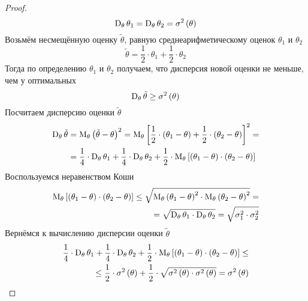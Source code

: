 \begin{proof}
  $$\operatorname{D}_{\theta} \theta_1
    = \operatorname{D}_{\theta} \theta_2
    = \sigma^2\left(\theta\right)$$
  Возьмём несмещённую оценку $\tilde{\theta}$,
  равную среднеарифметическому оценок $\theta_1$ и $\theta_2$
  $$\tilde{\theta}= \frac{1}{2}\cdot \theta_1+ \frac{1}{2}\cdot\theta_2$$
  Тогда по определению $\theta_1$ и $\theta_2$ получаем,
  что дисперсия новой оценки не меньше, чем у оптимальных
  \begin{equation}\label{eq:estimator_ge}
    \operatorname{D}_{\theta} \tilde{\theta}\ge\sigma^2\left(\theta\right)
  \end{equation}
  Посчитаем дисперсию оценки $\tilde{\theta}$
  \begin{align*}
  \operatorname{D}_{\theta} \tilde{\theta}
    &= \operatorname{M}_{\theta} \left( \tilde{\theta}-\theta \right)^2
    = \operatorname{M}_{\theta} \left[ \frac{1}{2}\cdot \left( \theta_1-\theta \right)
      + \frac{1}{2}\cdot \left( \theta_2-\theta \right) \right]^2= \\
    &= \frac{1}{4}\cdot \operatorname{D}_{\theta} \theta_1
      + \frac{1}{4}\cdot \operatorname{D}_{\theta} \theta_2
      + \frac{1}{2}\cdot \operatorname{M}_{\theta} \left[ \left( \theta_1-\theta \right)
          \cdot \left( \theta_2-\theta \right) \right]
  \end{align*}
  Воспользуемся неравенством Коши%
  \begin{eqnarray}\label{eq:koshi_eq}
    \operatorname{M}_{\theta} \left[ \left( \theta_1-\theta \right)
      \cdot \left( \theta_2-\theta \right) \right]
    \le\sqrt{\operatorname{M}_{\theta} \left( \theta_1-\theta \right)^2
      \cdot \operatorname{M}_{\theta} \left( \theta_2-\theta \right)^2}= \\
    = \sqrt{\operatorname{D}_{\theta} \theta_1
      \cdot \operatorname{D}_{\theta} \theta_2}
    = \sqrt{\sigma_1^2 \cdot \sigma_2^2}\nonumber
  \end{eqnarray}
  Вернёмся к вычислению дисперсии оценки $\tilde{\theta}$
  \begin{align*}
    \frac{1}{4}\cdot \operatorname{D}_{\theta} \theta_1
      + \frac{1}{4}\cdot \operatorname{D}_{\theta} \theta_2
      + \frac{1}{2}\cdot \operatorname{M}_{\theta} \left[ \left( \theta_1-\theta \right)
          \cdot \left( \theta_2-\theta \right) \right]\le\\
    \le\frac{1}{2}\cdot \sigma^2\left( \theta \right)
      + \frac{1}{2}\cdot \sqrt{\sigma^2\left( \theta \right)
        \cdot \sigma^2\left( \theta \right)}
    = \sigma^2\left( \theta \right)
  \end{align*}

\end{proof}
